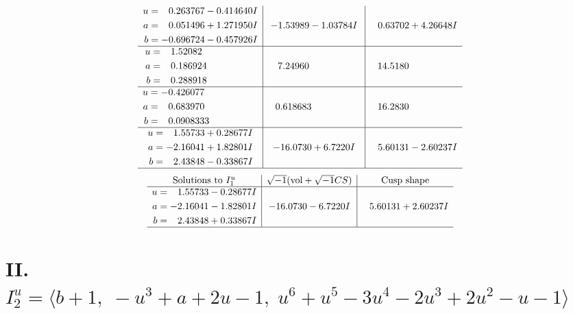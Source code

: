 \documentclass[1p]{elsarticle_modified}
\theoremstyle{definition}
\newcommand{\I}{\sqrt{-1}}
\begin{document}
$$\begin{array}{c|c|c}
\begin{aligned}
u &= \phantom{-}0.263767 - 0.414640 I \\
a &= \phantom{-}0.051496 + 1.271950 I \\
b &= -0.696724 - 0.457926 I\end{aligned}
 & -1.53989 - 1.03784 I & \phantom{-}0.63702 + 4.26648 I \\ \hline\begin{aligned}
u &= \phantom{-}1.52082\phantom{ +0.000000I} \\
a &= \phantom{-}0.186924\phantom{ +0.000000I} \\
b &= \phantom{-}0.288918\phantom{ +0.000000I}\end{aligned}
 & \phantom{-}7.24960\phantom{ +0.000000I} & \phantom{-}14.5180\phantom{ +0.000000I} \\ \hline\begin{aligned}
u &= -0.426077\phantom{ +0.000000I} \\
a &= \phantom{-}0.683970\phantom{ +0.000000I} \\
b &= \phantom{-}0.0908333\phantom{ +0.000000I}\end{aligned}
 & \phantom{-}0.618683\phantom{ +0.000000I} & \phantom{-}16.2830\phantom{ +0.000000I} \\ \hline\begin{aligned}
u &= \phantom{-}1.55733 + 0.28677 I \\
a &= -2.16041 + 1.82801 I \\
b &= \phantom{-}2.43848 - 0.33867 I\end{aligned}
 & -16.0730 + 6.7220 I & \phantom{-}5.60131 - 2.60237 I\\
 \hline 
 \end{array}$$\newpage$$\begin{array}{c|c|c}  
\text{Solutions to }I^u_{1}& \I (\text{vol} + \sqrt{-1}CS) & \text{Cusp shape}\\
 \hline 
\begin{aligned}
u &= \phantom{-}1.55733 - 0.28677 I \\
a &= -2.16041 - 1.82801 I \\
b &= \phantom{-}2.43848 + 0.33867 I\end{aligned}
 & -16.0730 - 6.7220 I & \phantom{-}5.60131 + 2.60237 I\\
 \hline 
 \end{array}$$\newpage\newpage\renewcommand{\arraystretch}{1}
\centering \section*{II. $I^u_{2}= \langle b+1,\;- u^3+a+2 u-1,\;u^6+u^5-3 u^4-2 u^3+2 u^2- u-1 \rangle$}
\end{document}
